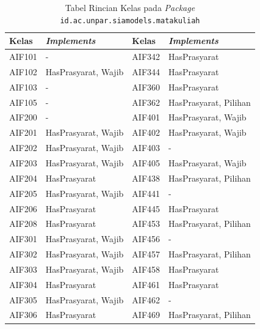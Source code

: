 \begin{enumerate}
\begin{table}[H]
	\centering
	\caption{Tabel Rincian Kelas pada \textit{Package} \texttt{id.ac.unpar.siamodels.matakuliah}}
    \begin{tabular}{|p{2.125cm}|p{4.5cm}|p{2.125cm}|p{4.5cm}|}
		\hline
		Kelas & \textit{Implements} & Kelas & \textit{Implements}\\
		\hline
    AIF101  & - &    AIF342  & HasPrasyarat               \\
    AIF102  & HasPrasyarat, Wajib        &    AIF344  & HasPrasyarat               \\
    AIF103  & -                          &    AIF360  & HasPrasyarat               \\
    AIF105  & -                          &    AIF362  & HasPrasyarat, Pilihan      \\
    AIF200  & -                          &    AIF401  & HasPrasyarat, Wajib        \\
    AIF201  & HasPrasyarat, Wajib        &    AIF402  & HasPrasyarat, Wajib        \\
    AIF202  & HasPrasyarat, Wajib        &    AIF403  & -                          \\
    AIF203  & HasPrasyarat, Wajib        &    AIF405  & HasPrasyarat, Wajib        \\
    AIF204  & HasPrasyarat               &    AIF438  & HasPrasyarat, Pilihan      \\
    AIF205  & HasPrasyarat, Wajib        &    AIF441  & -                          \\
    AIF206  & HasPrasyarat               &    AIF445  & HasPrasyarat               \\
    AIF208  & HasPrasyarat               &    AIF453  & HasPrasyarat, Pilihan      \\
    AIF301  & HasPrasyarat, Wajib        &    AIF456  & -                          \\
    AIF302  & HasPrasyarat, Wajib        &    AIF457  & HasPrasyarat, Pilihan      \\
    AIF303  & HasPrasyarat, Wajib        &    AIF458  & HasPrasyarat               \\
    AIF304  & HasPrasyarat               &    AIF461  & HasPrasyarat               \\
    AIF305  & HasPrasyarat, Wajib        &    AIF462  & -                          \\
    AIF306  & HasPrasyarat               &    AIF469  & HasPrasyarat, Pilihan      \\

\end{tabular}
\end{table}
\end{enumerate}
